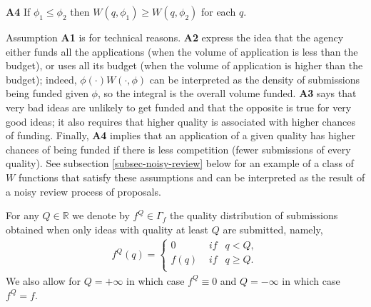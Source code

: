 \documentclass[12pt]{article}
\theoremstyle{plain}
\theoremstyle{definition}
\theoremstyle{remark}
\def\RR{\mathbb{R}}
\begin{document}
\textbf{A4} If $\phi_1\le \phi_2$ then $W(q,\phi_1)\ge W(q,\phi_2)$ for each $q$.

\medskip

Assumption \textbf{A1} is for technical reasons. \textbf{A2} express the idea that the agency either funds all the applications (when the volume of application is less than the budget), or uses all its budget (when the volume of application is higher than the budget); indeed, $\phi(\cdot)W(\cdot,\phi)$ can be interpreted as the density of submissions being funded given $\phi$, so the integral is the overall volume funded. \textbf{A3} says that very bad ideas are unlikely to get funded and that the opposite is true for very good ideas; it also requires that higher quality is associated with higher chances of funding. Finally, \textbf{A4} implies that an application of a given quality has higher chances of being funded if there is less competition (fewer submissions of every quality). See subsection \ref{subsec-noisy-review} below for an example of a class of $W$ functions that satisfy these assumptions and can be interpreted as the result of a noisy review process of proposals.  



For any $Q\in \RR$ we denote by $f^Q\in \Gamma_f$ the quality distribution of submissions obtained when only ideas with quality at least $Q$ are submitted, namely,  
\begin{eqnarray*}
f^Q(q) =
\left\{ \begin{array}{ll}
0 & \textit{ if } ~~q<Q,\\
f(q) & \textit{ if } ~~q\ge Q.\\
\end{array} \right.
\end{eqnarray*}
We also allow for $Q=+\infty$ in which case $f^Q\equiv 0$ and $Q=-\infty$ in which case $f^Q=f$. 
\end{document}

